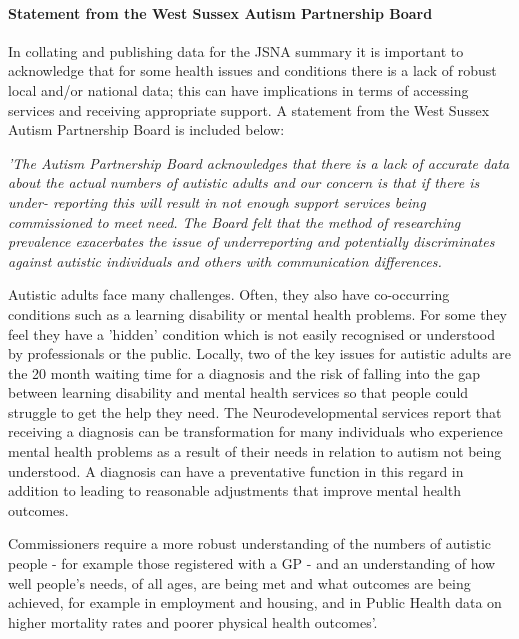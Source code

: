 \paragraph{Statement from the West Sussex Autism Partnership Board} In collating and publishing data for the JSNA summary it is important to acknowledge that for some health issues and conditions there is a lack of robust local and/or national data; this can have implications in terms of accessing services and receiving appropriate support. A statement from the West Sussex Autism Partnership Board is included below:

{\itshape 'The Autism Partnership Board acknowledges that there is a lack of accurate data about the actual numbers of autistic adults and our concern is that if there is under- reporting this will result in not enough support services being commissioned to meet need. The Board felt that the method of researching prevalence exacerbates the issue of underreporting and potentially discriminates against autistic individuals and others with communication differences.

Autistic adults face many challenges. Often, they also have co-occurring conditions such as a learning disability or mental health problems. For some they feel they have a 'hidden' condition which is not easily recognised or understood by professionals or the public. Locally, two of the key issues for autistic adults are the 20 month waiting time for a diagnosis and the risk of falling into the gap between learning disability and mental health services so that people could struggle to get the help they need. The Neurodevelopmental services report that receiving a diagnosis can be transformation for many individuals who experience mental health problems as a result of their needs in relation to autism not being understood. A diagnosis can have a preventative function in this regard in addition to leading to reasonable adjustments that improve mental health outcomes.

Commissioners require a more robust understanding of the numbers of autistic people - for example those registered with a GP - and an understanding of how well people's needs, of all ages, are being met and what outcomes are being achieved, for example in employment and housing, and in Public Health data on higher mortality rates and poorer physical health outcomes'.}


